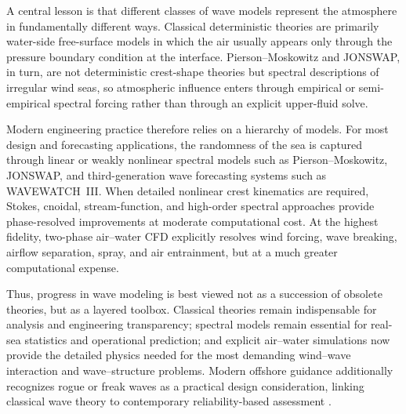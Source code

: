 \documentclass[journal,10pt,twocolumn]{IEEEtran}
\begin{document}
A central lesson is that different classes of wave models represent the atmosphere in
fundamentally different ways.
Classical deterministic theories are primarily water-side free-surface models in which
the air usually appears only through the pressure boundary condition at the interface.
Pierson--Moskowitz and JONSWAP, in turn, are not deterministic crest-shape theories but
spectral descriptions of irregular wind seas, so atmospheric influence enters through
empirical or semi-empirical spectral forcing rather than through an explicit upper-fluid
solve.

Modern engineering practice therefore relies on a hierarchy of models.
For most design and forecasting applications, the randomness of the sea is captured
through linear or weakly nonlinear spectral models such as Pierson--Moskowitz,
JONSWAP, and third-generation wave forecasting systems such as WAVEWATCH~III.
When detailed nonlinear crest kinematics are required, Stokes, cnoidal, stream-function,
and high-order spectral approaches provide phase-resolved improvements at moderate
computational cost.
At the highest fidelity, two-phase air--water CFD explicitly resolves wind forcing, wave
breaking, airflow separation, spray, and air entrainment, but at a much greater
computational expense.

Thus, progress in wave modeling is best viewed not as a succession of obsolete theories,
but as a layered toolbox.
Classical theories remain indispensable for analysis and engineering transparency;
spectral models remain essential for real-sea statistics and operational prediction;
and explicit air--water simulations now provide the detailed physics needed for the most
demanding wind--wave interaction and wave--structure problems.
Modern offshore guidance additionally recognizes rogue or freak waves as a practical
design consideration, linking classical wave theory to contemporary reliability-based
assessment \cite{DNVC205}.
\end{document}
